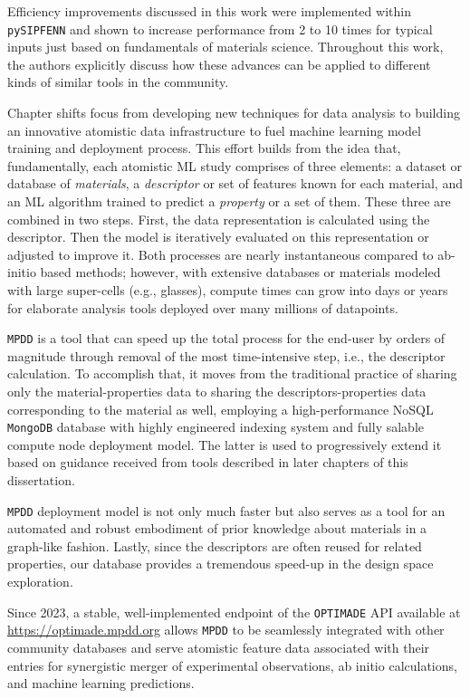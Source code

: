 Efficiency improvements discussed in this work were implemented within \texttt{pySIPFENN} and shown to increase performance from 2 to 10 times for typical inputs just based on fundamentals of materials science. Throughout this work, the authors explicitly discuss how these advances can be applied to different kinds of similar tools in the community.


Chapter  shifts focus from developing new techniques for data analysis to building an innovative atomistic data infrastructure to fuel machine learning model training and deployment process. This effort builds from the idea that, fundamentally, each atomistic ML study comprises of three elements: a dataset or database of \emph{materials}, a \emph{descriptor} or set of features known for each material, and an ML algorithm trained to predict a \emph{property} or a set of them. These three are combined in two steps. First, the data representation is calculated using the descriptor. Then the model is iteratively evaluated on this representation or adjusted to improve it. Both processes are nearly instantaneous compared to ab-initio based methods; however, with extensive databases or materials modeled with large super-cells (e.g., glasses), compute times can grow into days or years for elaborate analysis tools deployed over many millions of datapoints. 

\texttt{MPDD} is a tool that can speed up the total process for the end-user by orders of magnitude through removal of the most time-intensive step, i.e., the descriptor calculation. To accomplish that, it moves from the traditional practice of sharing only the material-properties data to sharing the descriptors-properties data corresponding to the material as well, employing a high-performance NoSQL \texttt{MongoDB} database with highly engineered indexing system and fully salable compute node deployment model. The latter is used to progressively extend it based on guidance received from tools described in later chapters of this dissertation.

\texttt{MPDD} deployment model is not only much faster but also serves as a tool for an automated and robust embodiment of prior knowledge about materials in a graph-like fashion. Lastly, since the descriptors are often reused for related properties, our database provides a tremendous speed-up in the design space exploration.

Since 2023, a stable, well-implemented endpoint of the \texttt{OPTIMADE} API available at \href{https://optimade.mpdd.org}{https://optimade.mpdd.org} allows \texttt{MPDD} to be seamlessly integrated with other community databases and serve atomistic feature data associated with their entries for synergistic merger of experimental observations, ab initio calculations, and machine learning predictions.


